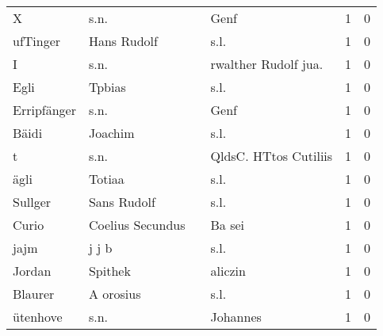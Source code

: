 \documentclass[10pt,a4paper,landscape]{article}
\begin{document}
\begin{longtable}{llllrr}
                        X &                               s.n. &             &                                        Genf &          1 &         0 \\
                 ufTinger &                        Hans Rudolf &             &                                        s.l. &          1 &         0 \\
                        I &                               s.n. &             &                       rwalther Rudolf jua.  &          1 &         0 \\
                     Egli &                             Tpbias &             &                                        s.l. &          1 &         0 \\
              Erripfänger &                               s.n. &             &                                        Genf &          1 &         0 \\
                    Bäidi &                            Joachim &             &                                        s.l. &          1 &         0 \\
                        t &                               s.n. &             &                       QldsC. HTtos Cutiliis &          1 &         0 \\
                     ägli &                             Totiaa &             &                                        s.l. &          1 &         0 \\
                  Sullger &                        Sans Rudolf &             &                                        s.l. &          1 &         0 \\
                    Curio &                   Coelius Secundus &             &                                      Ba sei &          1 &         0 \\
                     jajm &                              j j b &             &                                        s.l. &          1 &         0 \\
                   Jordan &                            Spithek &             &                                     aliczin &          1 &         0 \\
                  Blaurer &                          A orosius &             &                                        s.l. &          1 &         0 \\
                 ütenhove &                               s.n. &             &                                    Johannes &          1 &         0 \\

\end{longtable}
\end{document}
